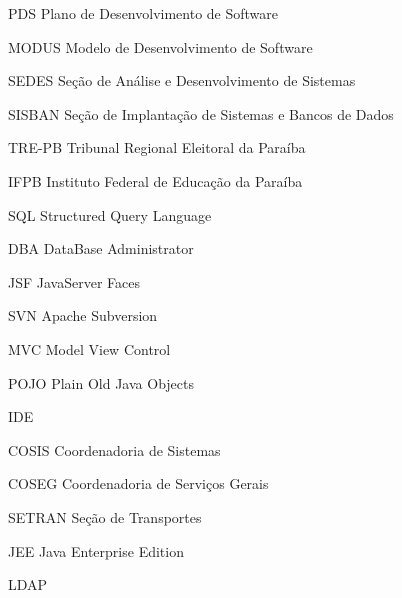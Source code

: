 
\begin{siglas}
    \item[PDS] Plano de Desenvolvimento de Software
    \item[MODUS] Modelo de Desenvolvimento de Software
    \item[SEDES] Seção de Análise e Desenvolvimento de Sistemas
    \item[SISBAN]Seção de Implantação de Sistemas e Bancos de Dados
    \item[TRE-PB] Tribunal Regional Eleitoral da Paraíba
    \item[IFPB] Instituto Federal de Educação da Paraíba
    \item[SQL] Structured Query Language
    \item[DBA] DataBase Administrator
    \item[JSF] JavaServer Faces
    \item[SVN] Apache Subversion
    \item[MVC] Model View Control
    \item[POJO] Plain Old Java Objects
    \item[IDE] 
    \item[COSIS] Coordenadoria de Sistemas
    \item[COSEG] Coordenadoria de Serviços Gerais
    \item[SETRAN] Seção de Transportes
    \item[JEE] Java Enterprise Edition
    \item[LDAP]   
\end{siglas}

